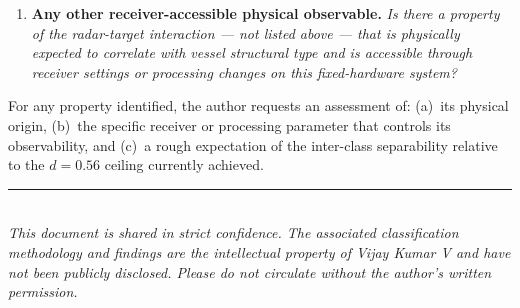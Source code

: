 \documentclass[10.5pt,a4paper]{article}
\begin{document}
\begin{enumerate}[noitemsep, leftmargin=*, label=\arabic*.]
  \item \textbf{Any other receiver-accessible physical observable.}
  \textit{Is there a property of the radar-target interaction — not listed above
  — that is physically expected to correlate with vessel structural type and
  is accessible through receiver settings or processing changes on this
  fixed-hardware system?}

\end{enumerate}

For any property identified, the author requests an assessment of: (a)~its physical
origin, (b)~the specific receiver or processing parameter that controls its
observability, and (c)~a rough expectation of the inter-class separability relative
to the $d = 0.56$ ceiling currently achieved.

\vspace{6pt}
\noindent\rule{\linewidth}{0.4pt}\\[2pt]
\noindent\small\textit{This document is shared in strict confidence.
The associated classification methodology and findings are the intellectual
property of Vijay Kumar V and have not been publicly disclosed.
Please do not circulate without the author's written permission.}
\end{document}
